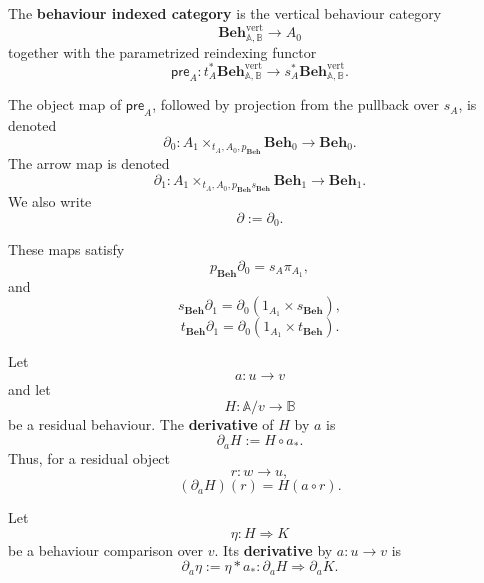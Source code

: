 \begin{definition}
\label{def:behaviour-indexed-category}
    The \textbf{behaviour indexed category} is the vertical behaviour
    category
    \[
        \mathbf{Beh}^{\mathrm{vert}}_{\mathbb A,\mathbb B}
        \longrightarrow A_0
    \]
    together with the parametrized reindexing functor
    \[
        \mathsf{pre}_A:
        t_A^*
        \mathbf{Beh}^{\mathrm{vert}}_{\mathbb A,\mathbb B}
        \longrightarrow
        s_A^*
        \mathbf{Beh}^{\mathrm{vert}}_{\mathbb A,\mathbb B}.
    \]

    The object map of \(\mathsf{pre}_A\), followed by projection from the
    pullback over \(s_A\), is denoted
    \[
        \partial_0:
        A_1
        \times_{t_A,A_0,p_{\mathbf{Beh}}}
        \mathbf{Beh}_0
        \longrightarrow
        \mathbf{Beh}_0.
    \]
    The arrow map is denoted
    \[
        \partial_1:
        A_1
        \times_{t_A,A_0,p_{\mathbf{Beh}}s_{\mathbf{Beh}}}
        \mathbf{Beh}_1
        \longrightarrow
        \mathbf{Beh}_1.
    \]
    We also write
    \[
        \partial:=\partial_0.
    \]

    These maps satisfy
    \[
        p_{\mathbf{Beh}}\partial_0
        =
        s_A\pi_{A_1},
    \]
    and
    \[
        s_{\mathbf{Beh}}\partial_1
        =
        \partial_0
        (1_{A_1}\times s_{\mathbf{Beh}}),
    \]
    \[
        t_{\mathbf{Beh}}\partial_1
        =
        \partial_0
        (1_{A_1}\times t_{\mathbf{Beh}}).
    \]
\end{definition}

\begin{definition}[Derivative]
\label{def:derivative-behaviour}
    Let
    \[
        a:u\to v
    \]
    and let
    \[
        H:\mathbb A/v\to\mathbb B
    \]
    be a residual behaviour. The \textbf{derivative} of \(H\) by \(a\) is
    \[
        \partial_aH
        :=
        H\circ a_*.
    \]
    Thus, for a residual object
    \[
        r:w\to u,
    \]
    \[
        (\partial_aH)(r)
        =
        H(a\circ r).
    \]
\end{definition}

\begin{definition}
\label{def:derivative-comparison}
    Let
    \[
        \eta:H\Rightarrow K
    \]
    be a behaviour comparison over \(v\). Its \textbf{derivative} by
    \(a:u\to v\) is
    \[
        \partial_a\eta
        :=
        \eta\ast a_*:
        \partial_aH\Rightarrow\partial_aK.
    \]
\end{definition}

